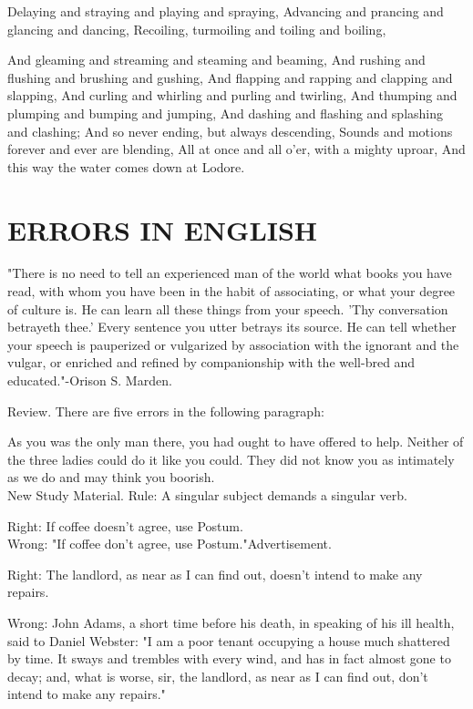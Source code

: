 \documentclass[10pt]{article}
\begin{document}
Delaying and straying and playing and spraying, Advancing and prancing and glancing and dancing, Recoiling, turmoiling and toiling and boiling,

And gleaming and streaming and steaming and beaming, And rushing and flushing and brushing and gushing, And flapping and rapping and clapping and slapping, And curling and whirling and purling and twirling, And thumping and plumping and bumping and jumping, And dashing and flashing and splashing and clashing; And so never ending, but always descending, Sounds and motions forever and ever are blending, All at once and all o'er, with a mighty uproar, And this way the water comes down at Lodore.

\section*{ERRORS IN ENGLISH}
"There is no need to tell an experienced man of the world what books you have read, with whom you have been in the habit of associating, or what your degree of culture is. He can learn all these things from your speech. 'Thy conversation betrayeth thee.' Every sentence you utter betrays its source. He can tell whether your speech is pauperized or vulgarized by association with the ignorant and the vulgar, or enriched and refined by companionship with the well-bred and educated."-Orison S. Marden.

Review. There are five errors in the following paragraph:

As you was the only man there, you had ought to have offered to help. Neither of the three ladies could do it like you could. They did not know you as intimately as we do and may think you boorish.\\
New Study Material. Rule: A singular subject demands a singular verb.

Right: If coffee doesn't agree, use Postum.\\
Wrong: "If coffee don't agree, use Postum."Advertisement.

Right: The landlord, as near as I can find out, doesn't intend to make any repairs.

Wrong: John Adams, a short time before his death, in speaking of his ill health, said to Daniel Webster: "I am a poor tenant occupying a house much shattered by time. It sways and trembles with every wind, and has in fact almost gone to decay; and, what is worse, sir, the landlord, as near as I can find out, don't intend to make any repairs."
\end{document}

